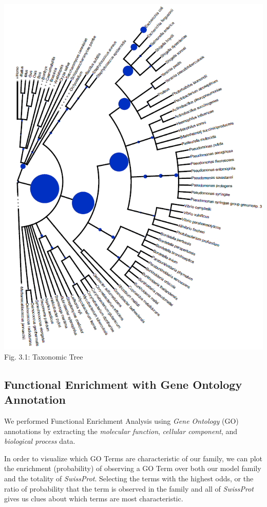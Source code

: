 \documentclass[10pt,twocolumn,letterpaper]{article}
\begin{document}
\begin{center}
    \includegraphics[scale=0.35]{report/img/taxonomy_tree.png}\\
    \small{Fig. 3.1: Taxonomic Tree}
\end{center}

\subsection{Functional Enrichment with Gene Ontology Annotation}

We performed Functional Enrichment Analysis using \textit{Gene Ontology} (GO) annotations by extracting the \textit{molecular function}, \textit{cellular component}, and \textit{biological process} data.

In order to visualize which GO Terms are characteristic of our family, we can plot the enrichment (probability) of observing a GO Term over both our model family and the totality of \textit{SwissProt}. Selecting the terms with the highest odds, or the ratio of probability that the term is observed in the family and all of \textit{SwissProt} gives us clues about which terms are most characteristic. 
\end{document}
